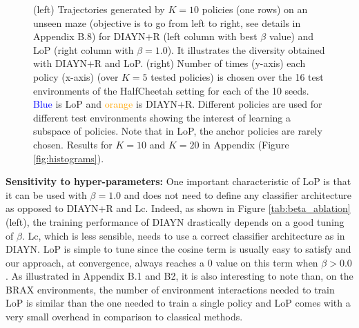 \begin{figure}[t!]
\begin{subfigure}{0.6\textwidth}
\end{subfigure}
\vspace{-0.4cm}
\caption{(left) Trajectories generated by $K=10$ policies (one rows) on an unseen maze (objective is to go from left to right, see details in Appendix B.8) for DIAYN+R (left column with best $\beta$ value) and LoP (right column with $\beta=1.0$). It illustrates the diversity obtained with DIAYN+R and LoP. (right) Number of times (y-axis) each policy (x-axis) (over $K=5$ tested policies) is chosen over the 16 test environments of the HalfCheetah setting for each of the 10 seeds. \textcolor{blue}{Blue} is LoP and \textcolor{orange}{orange} is DIAYN+R. Different policies are used for different test environments showing the interest of learning a subspace of policies. Note that in LoP, the anchor policies are rarely chosen. Results for $K=10$ and $K=20$ in Appendix (Figure \ref{fig:histograms}).}
\label{tab:diversity}
    \vspace{-0.6cm}
\end{figure}


%







\textbf{Sensitivity to hyper-parameters:} One important characteristic of LoP is that it can be used with $\beta=1.0$ and does not need to define any classifier architecture as opposed to DIAYN+R and Lc. Indeed, as shown in Figure \ref{tab:beta_ablation} (left), the training performance of DIAYN drastically depends on a good tuning of $\beta$. Lc, which is less sensible, needs to use a correct classifier architecture as in DIAYN. LoP is simple to tune since the cosine term is usually easy to satisfy and our approach, at convergence, always reaches a $0$ value on this term when $\beta>0.0$. As illustrated in Appendix B.1 and B2, it is also interesting to note than, on the BRAX environments, the number of environment interactions needed to train LoP is similar than the one needed to train a single policy and LoP comes with a very small overhead in comparison to classical methods.

